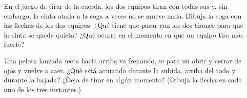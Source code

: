\begin{exercise}[$\star\star$]\label{exo:g2:pushes-and-pulls:9}
En el juego de tirar de la cuerda, los dos equipos tiran con todas sus
 y, sin embargo, la cinta atada a la soga a veces no se mueve
nada. Dibuja la soga con las flechas de los dos equipos. ¿Qué tiene que pasar con
los dos tirones para que la cinta se quede quieta? ¿Qué ocurre en el
momento en que un equipo tira más fuerte?
\end{exercise}

\begin{exercise}[$\star\star$]\label{exo:g2:pushes-and-pulls:10}
Una pelota lanzada recta hacia arriba va frenando, se para un abrir y
cerrar de ojos y vuelve a caer. ¿Qué  está actuando durante la
subida, arriba del todo y durante la bajada? ¿Deja de tirar en algún
momento? (Dibuja la flecha en cada uno de los tres instantes.)
\end{exercise}
